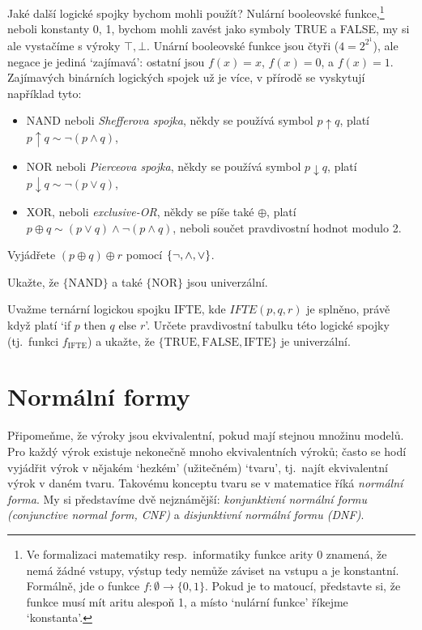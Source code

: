 Jaké další logické spojky bychom mohli použít? Nulární booleovské funkce,\footnote{Ve formalizaci matematiky resp.\ informatiky funkce arity 0 znamená, že nemá žádné vstupy, výstup tedy nemůže záviset na vstupu a je konstantní. Formálně, jde o funkce $f\colon \emptyset\to \{0,1\}$. Pokud je to matoucí, představte si, že funkce musí mít aritu alespoň 1, a místo `nulární funkce' říkejme `konstanta'.} neboli konstanty 0, 1, bychom mohli zavést jako symboly TRUE a FALSE, my si ale vystačíme s výroky $\top,\bot$.  Unární booleovské funkce jsou čtyři ($4=2^{2^1}$), ale negace je jediná `zajímavá': ostatní jsou $f(x)=x$, $f(x)=0$, a $f(x)=1$. Zajímavých binárních logických spojek už je více, v přírodě se vyskytují například tyto:
\begin{itemize}
    \item NAND neboli \emph{Shefferova spojka},  někdy se používá symbol $p\uparrow q$, platí $p\uparrow q \sim \neg (p\land q)$,
    \item NOR neboli \emph{Pierceova spojka},  někdy se používá symbol $p\downarrow q$, platí $p\downarrow q \sim \neg (p\lor q)$,
    \item XOR, neboli \emph{exclusive-OR}, někdy se píše také $\oplus$, platí $p\oplus q \sim (p\lor q)\land\neg(p\land q)$, neboli součet pravdivostní hodnot modulo 2.
\end{itemize}

\begin{exercise}
    Vyjádřete $(p\oplus q)\oplus r$ pomocí $\{\neg, {\land},{\lor}\}$.
\end{exercise}

\begin{exercise}
    Ukažte, že $\{\mathrm{NAND}\}$ a také $\{\mathrm{NOR}\}$ jsou univerzální.
\end{exercise}

\begin{exercise}
Uvažme ternární logickou spojku $\mathrm{IFTE}$, kde $IFTE(p,q,r)$ je splněno, právě když platí `if $p$ then $q$ else $r$'. Určete pravdivostní tabulku této logické spojky (tj.\ funkci $f_\mathrm{IFTE}$) a ukažte, že $\{\mathrm{TRUE}, \mathrm{FALSE},\mathrm{IFTE}\}$ je univerzální.
\end{exercise}


\section{Normální formy}

Připomeňme, že výroky jsou ekvivalentní, pokud mají stejnou množinu modelů. Pro každý výrok existuje nekonečně mnoho ekvivalentních výroků; často se hodí vyjádřit výrok v nějakém `hezkém' (užitečném) `tvaru', tj.\ najít ekvivalentní výrok v daném tvaru. Takovému konceptu tvaru se v matematice říká \emph{normální forma}. My si představíme dvě nejznámější: \emph{konjunktivní normální formu (conjunctive normal form, CNF)} a \emph{disjunktivní normální formu (DNF)}. 

